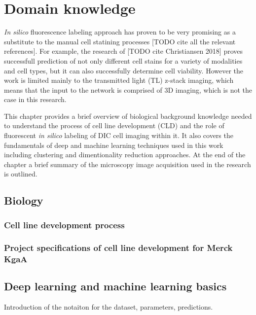 \section{Domain knowledge}

    \textit{In silico} fluorescence labeling approach has proven to be very promising as a substitute to the manual cell statining processes [TODO cite all the relevant references]. For example, the research of [TODO cite Christiansen 2018] proves successfull prediction of not only different cell stains for a variety of modalities and cell types, but it can also successfully determine cell viability. However the work is limited mainly to the transmitted light (TL) z-stack imaging, which means that the input to the network is comprised of 3D imaging, which is not the case in this research.

    This chapter provides a brief overview of biological background knowledge needed to understand the process of cell line development (CLD) and the role of fluorescent \textit{in silico} labeling of DIC cell imaging within it. It also covers the fundamentals of deep and machine learning techniques used in this work including clustering and dimentionality reduction approaches. At the end of the chapter a brief summary of the microscopy image acquisition used in the research is outlined.
    \subsection{Biology}
        \subsubsection{Cell line development process}
        
        \subsubsection{Project specifications of cell line development for Merck KgaA}
        
    \subsection{Deep learning and machine learning basics}
        Introduction of the notaiton for the dataset, parameters, predictions.
